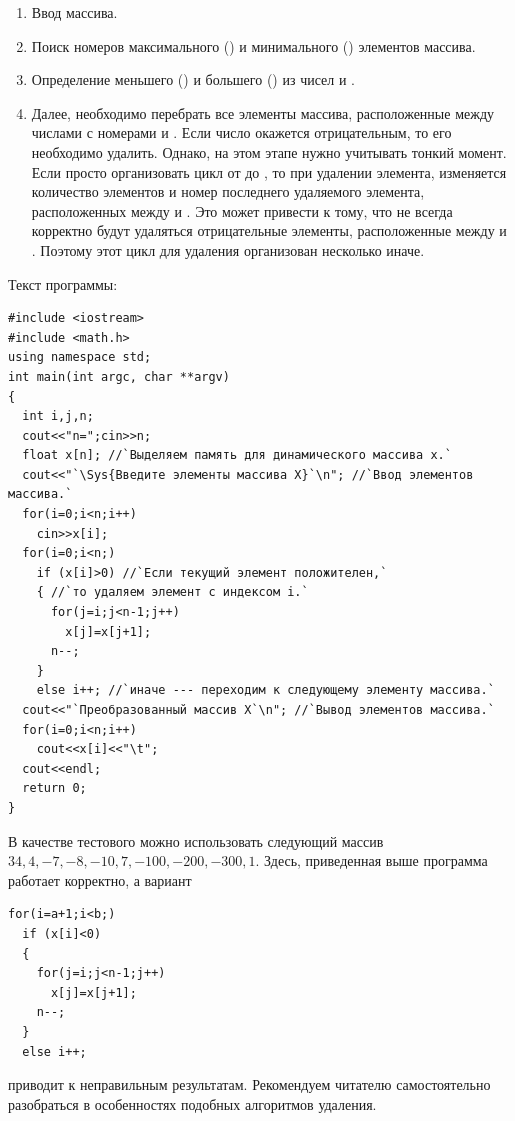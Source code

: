 \begin{enumerate}
\item Ввод массива.
\item Поиск номеров максимального () и минимального () элементов массива.
\item Определение меньшего () и большего () из чисел  и
.
\item Далее, необходимо перебрать все элементы массива, расположенные между числами с номерами  и
. Если число окажется отрицательным, то его необходимо удалить. Однако, на этом этапе нужно
учитывать тонкий момент. Если просто организовать цикл от  до , то при
удалении элемента, изменяется количество элементов и номер последнего удаляемого элемента, расположенных между
 и . Это может привести к тому, что не всегда корректно будут удаляться
отрицательные элементы, расположенные между  и . Поэтому этот цикл для удаления
организован несколько иначе.
\end{enumerate}

Текст программы:
\begin{lstlisting}
#include <iostream>
#include <math.h>
using namespace std;
int main(int argc, char **argv)
{
  int i,j,n;
  cout<<"n=";cin>>n;
  float x[n]; //`Выделяем память для динамического массива x.`
  cout<<"`\Sys{Введите элементы массива X}`\n"; //`Ввод элементов массива.`
  for(i=0;i<n;i++)
    cin>>x[i];
  for(i=0;i<n;)
    if (x[i]>0) //`Если текущий элемент положителен,`
    { //`то удаляем элемент с индексом i.`
      for(j=i;j<n-1;j++)
        x[j]=x[j+1];
      n--;
    }
    else i++; //`иначе --- переходим к следующему элементу массива.`
  cout<<"`Преобразованный массив X`\n"; //`Вывод элементов массива.`
  for(i=0;i<n;i++)
    cout<<x[i]<<"\t";
  cout<<endl;
  return 0;
}
\end{lstlisting}


В качестве тестового можно использовать следующий массив $34, 4, -7, -8, -10, 7, -100, -200, -300, 1$. Здесь, приведенная
выше программа работает корректно, а вариант 
\begin{lstlisting}
for(i=a+1;i<b;) 
  if (x[i]<0) 
  { 
    for(j=i;j<n-1;j++)
      x[j]=x[j+1]; 
    n--;
  }
  else i++;
\end{lstlisting}
приводит к неправильным результатам. Рекомендуем читателю самостоятельно разобраться в особенностях подобных алгоритмов
удаления.


